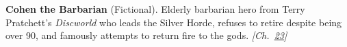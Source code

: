 \textbf{Cohen the Barbarian} (Fictional). Elderly barbarian hero from Terry Pratchett's \emph{Discworld} who leads the Silver Horde, refuses to retire despite being over 90, and famously attempts to return fire to the gods. \emph{[Ch.~\hyperref[ch:blackholetimedilationredshift]{23}]}

